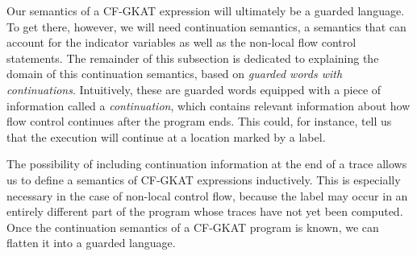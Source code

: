 Our semantics of a CF-GKAT expression will ultimately be a guarded language.
To get there, however, we will need continuation semantics, a semantics that can account for the indicator variables as well as the non-local flow control statements.
The remainder of this subsection is dedicated to explaining the domain of this continuation semantics, based on \emph{guarded words with continuations}.
Intuitively, these are guarded words equipped with a piece of information called a \emph{continuation}, which contains relevant information about how flow control continues after the program ends.
This could, for instance, tell us that the execution will continue at a location marked by a label.

The possibility of including continuation information at the end of a trace allows us to define a semantics of CF-GKAT expressions inductively.
This is especially necessary in the case of non-local control flow, because the label may occur in an entirely different part of the program whose traces have not yet been computed.
Once the continuation semantics of a CF-GKAT program is known, we can flatten it into a guarded language.

